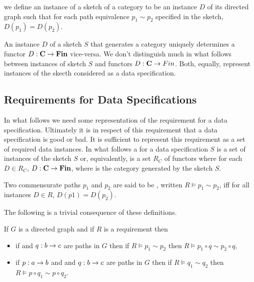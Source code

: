 we define an instance of a sketch of a category to be an instance $D$ of its directed graph such that
for each path equivalence $p_1 \sim p_2$ specified in the sketch, $D(p_1)=D(p_2)$.

An instance $D$ of a sketch $S$ that generates a category \catcw 
uniquely determines a functor $D:\textbf{C} \rightarrow \textbf{Fin}$ vice-versa. We don't distinguish much in what follows between instances of sketch $S$ and functors $D: \textbf{C} \rightarrow Fin$. Both, equally, represent instances of the skecth considered as a data specification.

\subsection{Requirements for Data Specifications}

In what follows we need some representation of the requirement for a data specification. Ultimately it is in respect of this requirement that a data specification is good or bad. It is sufficient to 
represent this requirement as a set of required data instances. 
In what follows a  for a data specification $S$ 
is a set of instances of the sketch $S$ or, equivalently, is a set $R_C$ of functors where for each
$D \in R_C$, $D: \textbf{C} \rightarrow \textbf{Fin}$, where \catcw is the category generated by the sketch $S$.

Two commensurate paths $p_1$ and $p_2$ are  said to be , 
written $R \models p_1 \sim p_2$, iff 
for all instances $D \in R$, $D(p1)=D(p_2)$.

The following is a trivial consequence of these definitions.
\begin{lemma}
\label{pathequivalenceinference}
If $G$ is a directed graph and if $R$ is a requirement then 
\begin{itemize}
\item if  and $q: b \rightarrow c$ are paths in $G$ then if $R \models p_1 \sim p_2$  
then $R \models p_1 \circ q \sim p_2 \circ q$,
\item if $p: a \rightarrow b$ and  and $q: b \rightarrow c$ are paths in $G$ then if $R \models q_1 \sim q_2$  
then $R \models p \circ q_1 \sim p \circ q_2$.
\end{itemize}
\end{lemma}